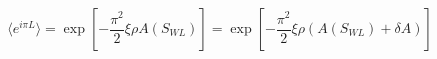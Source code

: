 \begin{equation}
\label{extremal}
\langle e^{i\pi L}\rangle =\exp [-\frac{\pi^2}{2}\xi \rho A(S_{WL})]=\exp [-\frac{\pi^2}{2}\xi \rho (A(S_{WL})+\delta A)]
\end{equation}


